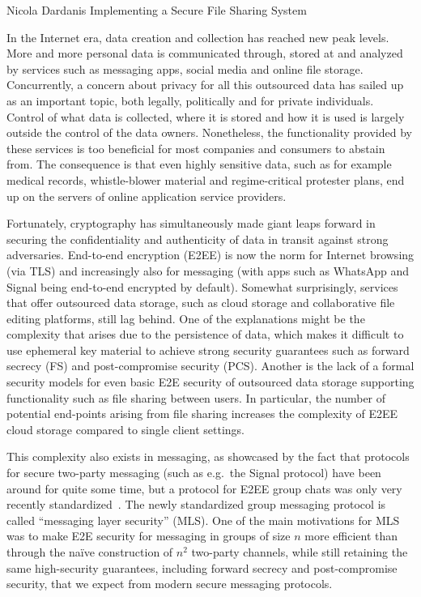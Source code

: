 \documentclass[E]{BAMASA}
\begin{document}
%
{Nicola Dardanis}%
{Implementing a Secure File Sharing System}


\intro
In the Internet era, data creation and collection has reached new peak levels.
More and more personal data is communicated through, stored at and analyzed by services such as messaging apps, social media and online file storage.
Concurrently, a concern about privacy for all this outsourced data has sailed up as an important topic, both legally, politically and for private individuals.
Control of what data is collected, where it is stored and how it is used is largely outside the control of the data owners.
Nonetheless, the functionality provided by these services is too beneficial for most companies and consumers to abstain from.
The consequence is that even highly sensitive data, such as for example medical records, whistle-blower material and regime-critical protester plans, end up on the servers of online application service providers.

Fortunately, cryptography has simultaneously made giant leaps forward in securing the confidentiality and authenticity of data in transit against strong adversaries.
End-to-end encryption (E2EE) is now the norm for Internet browsing (via TLS) and increasingly also for messaging (with apps such as WhatsApp and Signal being end-to-end encrypted by default).
Somewhat surprisingly, services that offer outsourced data storage, such as cloud storage and collaborative file editing platforms, still lag behind.
One of the explanations might be the complexity that arises due to the persistence of data, which makes it difficult to use ephemeral key material to achieve strong security guarantees such as forward secrecy (FS) and post-compromise security (PCS).
Another is the lack of a formal security models for even basic E2E security of outsourced data storage supporting functionality such as file sharing between users.
In particular, the number of potential end-points arising from file sharing increases the complexity of E2EE cloud storage compared to single client settings.

This complexity also exists in messaging, as showcased by the fact that protocols for secure two-party messaging (such as e.g.\ the Signal protocol) have been around for quite some time, but a protocol for E2EE group chats was only very recently standardized~\cite{rfc9420}.
The newly standardized group messaging protocol is called ``messaging layer security'' (MLS).
One of the main motivations for MLS was to make E2E security for messaging in groups of size $n$ more efficient than through the naïve construction of $n^2$ two-party channels, while still retaining the same high-security guarantees, including forward secrecy and post-compromise security, that we expect from modern secure messaging protocols.
\end{document}
